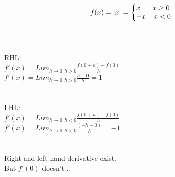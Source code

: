 \documentclass{book}
\newtheorem{example}{Example}[section]
\DeclarePairedDelimiter\abs{\lvert}{\rvert}%
\begin{document}
\begin{tcolorbox}[width=\textwidth,colback={mygray},title={\begin{example}Derivative of the absolute value\end{example}},colbacktitle=myred,coltitle=black]    

 \begin{equation}
  f(x) = \abs{x}=\left\{
    \begin{array}{@{} l c @{}}
      x & \text{$x \geq 0 $ } \\
      -x & \text{$ x < 0 $}
    \end{array}\right.
  \label{}
\end{equation}\\

  \\
\underline{RHL}:\\ $f'(x)  = Lim_{h \to 0 , h > 0 }\displaystyle\frac{f(0+h)-f(0)}{h}$\\
       $f'(x)= Lim_{h \to 0 , h > 0}\displaystyle\frac{h-0}{h} = 1$\\~\\~\\
\underline{LHL}:\\ $f'(x)  = Lim_{h \to 0 , h < 0 }\displaystyle\frac{f(0+h)-f(0)}{h}$\\
       $f'(x)= Lim_{h \to 0 , h < 0}\displaystyle\frac{(-h-0)}{h} = -1$\\~\\~\\
       
       Right and left hand derivative exist.\\But $f'(0)$ doesn't .

\end{tcolorbox}
\end{document}
